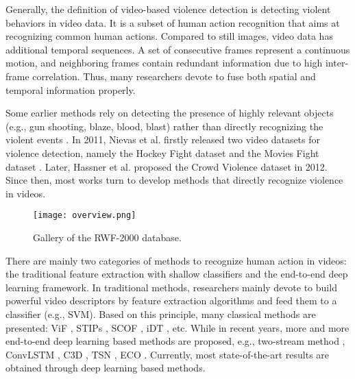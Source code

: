 \documentclass[a4paper,conference]{IEEEtran}
\begin{document}
Generally, the definition of video-based violence detection is detecting violent behaviors in video data. It is a subset of human action recognition that aims at recognizing common human actions. Compared to still images, video data has additional temporal sequences. A set of consecutive frames represent a continuous motion, and neighboring frames contain redundant information due to high inter-frame correlation. Thus, many researchers devote to fuse both spatial and temporal information properly.

Some earlier methods rely on detecting the presence of highly relevant objects (e.g., gun shooting, blaze, blood, blast) rather than directly recognizing the violent events \cite{r5, r6, r7}. In 2011, Nievas et al. firstly released two video datasets for violence detection, namely the Hockey Fight dataset \cite{nievas2011hockey} and the Movies Fight dataset \cite{nievas2011movies}. Later, Hassner et al. \cite{r3} proposed the Crowd Violence dataset in 2012. Since then, most works turn to develop methods that directly recognize violence in videos.

\begin{figure}[t]
  \texttt{[image: overview.png]}
  \caption{Gallery of the RWF-2000 database.}
  \label{gallery}
\end{figure}

There are mainly two categories of methods to recognize human action in videos: the traditional feature extraction with shallow classifiers and the end-to-end deep learning framework. In traditional methods, researchers mainly devote to build powerful video descriptors by feature extraction algorithms and feed them to a classifier (e.g., SVM). Based on this principle, many classical methods are presented: ViF \cite{r3}, STIPs \cite{r8}, SCOF \cite{r10}, iDT \cite{r11}, etc. While in recent years, more and more end-to-end deep learning based methods are proposed, e.g., two-stream method \cite{r14}, ConvLSTM \cite{r13}, C3D \cite{r1}, TSN \cite{r4}, ECO \cite{r2}. Currently, most state-of-the-art results are obtained through deep learning based methods.
\end{document}
